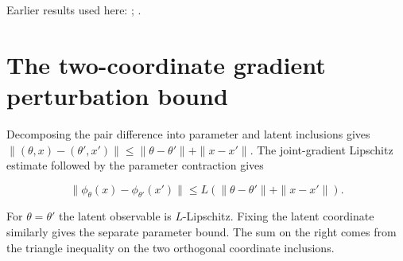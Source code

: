 \documentclass[11pt,a4paper]{article}
\begin{document}
Earlier results used here: \cite[Section~3.1.1]{LangevinLean2026IPLA}; \cite[Section~3.3.1]{LangevinLean2026IPLA}.

\section{\texorpdfstring{The two-coordinate gradient perturbation bound}{The two-coordinate gradient perturbation bound}}


Decomposing the pair difference into parameter and latent inclusions gives \(\|(\theta,x)-(\theta',x')\|\le\|\theta-\theta'\|+\|x-x'\|\). The joint-gradient Lipschitz estimate followed by the parameter contraction gives

\[\|\phi_\theta(x)-\phi_{\theta'}(x')\|\le L(\|\theta-\theta'\|+\|x-x'\|).\]

For \(\theta=\theta'\) the latent observable is \(L\)-Lipschitz. Fixing the latent coordinate similarly gives the separate parameter bound. The sum on the right comes from the triangle inequality on the two orthogonal coordinate inclusions.
\end{document}
